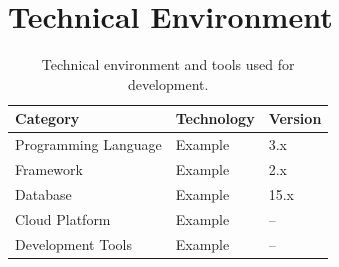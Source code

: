 \section{Technical Environment}

\begin{table}[H]
	\centering
	\caption{Technical environment and tools used for development.}
	\label{tab:tech-env}
	\begin{tabular}{|p{4cm}|p{4cm}|p{4cm}|}
		\hline
		\textbf{Category} & \textbf{Technology} & \textbf{Version} \\
		\hline
		Programming Language & Example & 3.x \\
		\hline
		Framework & Example & 2.x \\
		\hline
		Database & Example & 15.x \\
		\hline
		Cloud Platform & Example & -- \\
		\hline
		Development Tools & Example & -- \\
		\hline
	\end{tabular}
\end{table}
